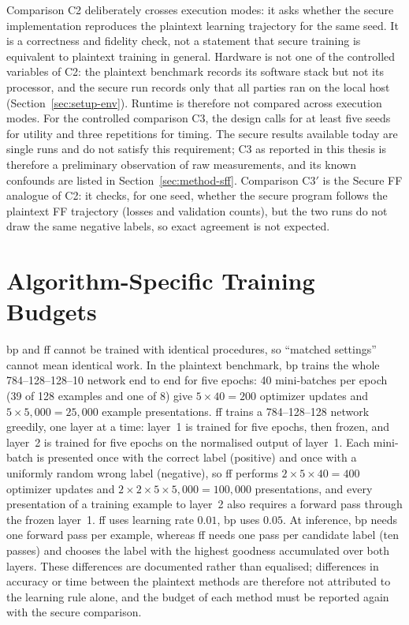 Comparison C2 deliberately crosses execution modes: it asks whether the secure implementation reproduces the plaintext learning trajectory for the same seed. It is a correctness and fidelity check, not a statement that secure training is equivalent to plaintext training in general. Hardware is not one of the controlled variables of C2: the plaintext benchmark records its software stack but not its processor, and the secure run records only that all parties ran on the local host (Section~\ref{sec:setup-env}). Runtime is therefore not compared across execution modes. For the controlled comparison C3, the design calls for at least five seeds for utility and three repetitions for timing. The secure results available today are single runs and do not satisfy this requirement; C3 as reported in this thesis is therefore a preliminary observation of raw measurements, and its known confounds are listed in Section~\ref{sec:method-sff}. Comparison C3$'$ is the Secure FF analogue of C2: it checks, for one seed, whether the secure program follows the plaintext FF trajectory (losses and validation counts), but the two runs do not draw the same negative labels, so exact agreement is not expected.

\section{Algorithm-Specific Training Budgets}\label{sec:method-budget}
\ac{bp} and \ac{ff} cannot be trained with identical procedures, so ``matched settings'' cannot mean identical work. In the plaintext benchmark, \ac{bp} trains the whole 784--128--128--10 network end to end for five epochs: 40 mini-batches per epoch (39 of 128 examples and one of 8) give $5\times40=200$ optimizer updates and $5\times5{,}000=25{,}000$ example presentations. \ac{ff} trains a 784--128--128 network greedily, one layer at a time: layer~1 is trained for five epochs, then frozen, and layer~2 is trained for five epochs on the normalised output of layer~1. Each mini-batch is presented once with the correct label (positive) and once with a uniformly random wrong label (negative), so \ac{ff} performs $2\times5\times40=400$ optimizer updates and $2\times2\times5\times5{,}000=100{,}000$ presentations, and every presentation of a training example to layer~2 also requires a forward pass through the frozen layer~1. \ac{ff} uses learning rate $0.01$, \ac{bp} uses $0.05$. At inference, \ac{bp} needs one forward pass per example, whereas \ac{ff} needs one pass per candidate label (ten passes) and chooses the label with the highest goodness accumulated over both layers. These differences are documented rather than equalised; differences in accuracy or time between the plaintext methods are therefore not attributed to the learning rule alone, and the budget of each method must be reported again with the secure comparison.

